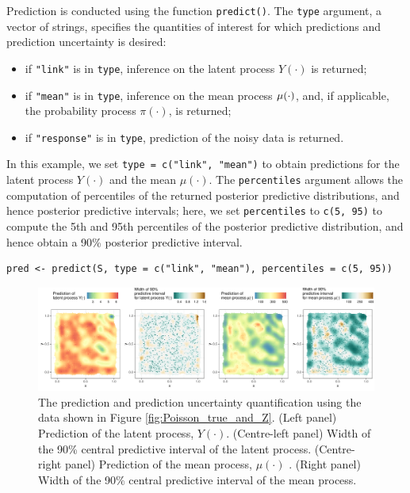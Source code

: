 \documentclass[12pt,a4paper]{article}
\begin{document}
Prediction is conducted using the function \texttt{predict()}. 
The \texttt{type} argument, a vector of strings, specifies the quantities of interest for which predictions and prediction uncertainty is desired:
\begin{itemize}
    \item if \texttt{"link"} is in \texttt{type}, inference on the latent process $Y(\cdot)$ is returned;
    \item if \texttt{"mean"} is in \texttt{type}, inference on the mean process $\mu(\cdot)$, and, if applicable, the probability process $\pi(\cdot)$, is returned;
    \item if \texttt{"response"} is in \texttt{type}, prediction of the noisy data is returned.
\end{itemize}
In this example, we set \texttt{type = c("link", "mean")} to obtain predictions for the latent process $Y(\cdot)$ and the mean $\mu(\cdot)$. 
The \texttt{percentiles} argument allows the computation of percentiles of the returned posterior predictive distributions, and hence posterior predictive intervals; here, we set \texttt{percentiles} to \texttt{c(5, 95)} to compute the 5th and 95th percentiles of the posterior predictive distribution, and hence obtain a 90\% posterior predictive interval.



\begin{minipage}{\linewidth}
\begin{lstlisting}[style=R]
pred <- predict(S, type = c("link", "mean"), percentiles = c(5, 95))
\end{lstlisting}
\end{minipage}

\begin{figure}[t!]
    \centering
    \includegraphics[width = \linewidth]{Images/Poisson_nres3.pdf}
    \caption{The prediction and prediction uncertainty quantification using the data shown in Figure \ref{fig:Poisson_true_and_Z}. (Left panel) Prediction of the latent process, $Y(\cdot)$. (Centre-left panel) Width of the 90\% central predictive interval of the latent process. (Centre-right panel) Prediction of the mean process, $\mu(\cdot)$ . (Right panel) Width of the 90\% central predictive interval of the mean process. 
}   
  \label{fig:Poisson_nres3}
\end{figure}
\end{document}
